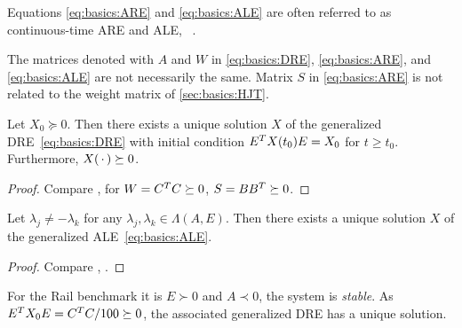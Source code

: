\begin{remark}
  Equations \eqref{eq:basics:ARE} and \eqref{eq:basics:ALE} are often referred to as
  continuous-time \ac{ARE} and \ac{ALE}, \cf~\cite[Remark~2.11]{Lang2017}.
\end{remark}

\begin{remark}
  The matrices denoted with $A$ and $W$ in \eqref{eq:basics:DRE}, \eqref{eq:basics:ARE}, and \eqref{eq:basics:ALE} are not necessarily the same.
  Matrix $S$ in \eqref{eq:basics:ARE} is not related to the weight matrix of \autoref{sec:basics:HJT}.
\end{remark}

\begin{theorem}
  Let $X_0 \succeq 0$.
  Then there exists a unique solution $X$ of the generalized \ac{DRE}~\eqref{eq:basics:DRE}
  with initial condition $E^T X(t_0) E = X_0$ for $t \geq t_0$.
  Furthermore, $X(\optional{}) \succeq 0$.
\end{theorem}
\begin{proof}
  Compare \cite[Theorem~2.7]{Lang2017}, \cite[Theorem~4.1.6]{Abou2003}
  for $W = C^T C \succeq 0$, $S=BB^T \succeq 0$.
\end{proof}


\begin{theorem}
  Let $\lambda_j \neq -\lambda_k$ for any $\lambda_j, \lambda_k \in\Lambda(A, E)$.
  Then there exists a unique solution $X$ of the generalized \ac{ALE}~\eqref{eq:basics:ALE}.
\end{theorem}
\begin{proof}
  Compare \cite[Theorem~2.10]{Lang2017}, \cite[Corollary~1.1.4]{Abou2003}.
\end{proof}

\begin{example}
  For the Rail benchmark \cite{morwiki_steel} it is
  $E \succ 0$ and $A \prec 0$, \ie the system is \emph{stable}.
  As $E^T X_0 E = C^T C / 100 \succeq 0$,
  the associated generalized \ac{DRE} has a unique solution.
\end{example}
